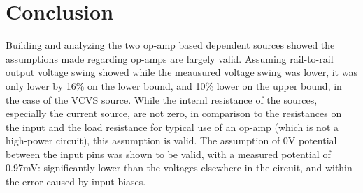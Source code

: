 \section{Conclusion}\label{sec:conclusion}
Building and analyzing the two op-amp based dependent sources showed the assumptions made regarding op-amps are largely valid. Assuming rail-to-rail output voltage swing showed while the meausured voltage swing was lower, it was only lower by 16\% on the lower bound, and 10\% lower on the upper bound, in the case of the VCVS source. While the internl resistance of the sources, especially the current source, are not zero, in comparison to the resistances on the input and the load resistance for typical use of an op-amp (which is not a high-power circuit), this assumption is valid. The assumption of 0\si{\volt} potential between the input pins was shown to be valid, with a measured potential of 0.97\si{\milli\volt}: significantly lower than the voltages elsewhere in the circuit, and within the error caused by input biases.
